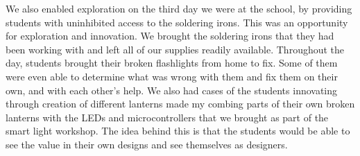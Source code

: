 \documentclass[11pt, twocolumn]{article}
\begin{document}
We also enabled exploration on the third day we were at the school, by providing students with uninhibited access to the soldering irons. This was an opportunity for exploration and innovation. We brought the soldering irons that they had been working with and left all of our supplies readily available. Throughout the day, students brought their broken flashlights from home to fix. Some of them were even able to determine what was wrong with them and fix them on their own, and with each other’s help. We also had cases of the students innovating through creation of different lanterns made my combing parts of their own broken lanterns with the LEDs and microcontrollers that we brought as part of the smart light workshop. The idea behind this is that the students would be able to see the value in their own designs and see themselves as designers.

\end{document}
